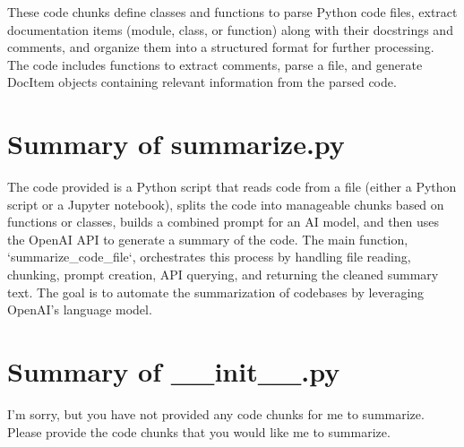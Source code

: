 \documentclass{article}
\begin{document}
These code chunks define classes and functions to parse Python code files, extract documentation items (module, class, or function) along with their docstrings and comments, and organize them into a structured format for further processing. The code includes functions to extract comments, parse a file, and generate DocItem objects containing relevant information from the parsed code.







\section{Summary of summarize.py}


The code provided is a Python script that reads code from a file (either a Python script or a Jupyter notebook), splits the code into manageable chunks based on functions or classes, builds a combined prompt for an AI model, and then uses the OpenAI API to generate a summary of the code. The main function, `summarize_code_file`, orchestrates this process by handling file reading, chunking, prompt creation, API querying, and returning the cleaned summary text. The goal is to automate the summarization of codebases by leveraging OpenAI's language model.







\section{Summary of __init__.py}


I'm sorry, but you have not provided any code chunks for me to summarize. Please provide the code chunks that you would like me to summarize.
\end{document}
